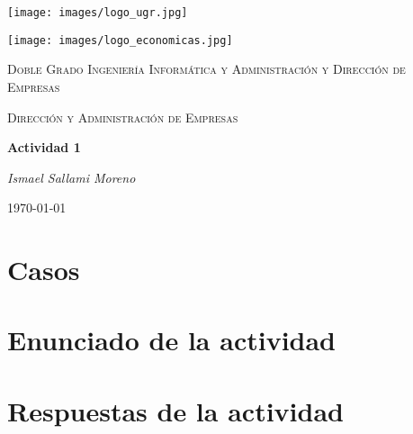 \documentclass{article}
\newcommand{\myTitle}{Actividad 1}
\newcommand{\myAuthor}{Ismael Sallami Moreno}
\newcommand{\myDegree}{Doble Grado Ingeniería Informática y Administración y Dirección de Empresas}
\newcommand{\mySubject}{Dirección y Administración de Empresas}
\newcommand{\myDate}{\today}
\begin{document}
\begin{titlepage}
    \centering
    \begin{minipage}{0.45\textwidth}
        \centering
        \texttt{[image: images/logo\_ugr.jpg]}
    \end{minipage}
    \hfill
    \begin{minipage}{0.45\textwidth}
        \centering
        \texttt{[image: images/logo\_economicas.jpg]} 
    \end{minipage}
    \vspace{1cm}
    
    {\scshape\LARGE \myDegree \par}
    \vspace{1cm}
    {\scshape\Large \mySubject \par}
    \vspace{1.5cm}
    {\huge\bfseries \myTitle \par}
    \vspace{2cm}
    {\Large\itshape \myAuthor \par}
    \vfill
    \myDate\par
\end{titlepage}

\tableofcontents
\newpage

\section{Casos}



\section{Enunciado de la actividad}

\section{Respuestas de la actividad}
\end{document}
